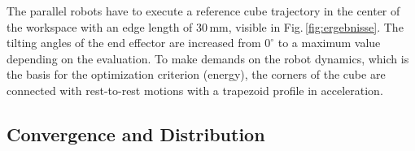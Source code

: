 \documentclass[fleqn,a4paper,10pt]{article}
\newcommand{\bm}[1]{\mathbf{#1}}
\newcommand{\transp}[0]{{\mathrm{T}}}
\begin{document}
\begin{multicols}{2}
The parallel robots have to execute a reference cube trajectory in the center of the workspace with an edge length of 30\,mm, visible in Fig.\,\ref{fig:ergebnisse}.
The tilting angles of the end effector are increased from $0^\circ$ to a maximum value depending on the evaluation. %
To make demands on the robot dynamics, which is the basis for the optimization criterion (energy), the corners of the cube are connected with rest-to-rest motions with a  trapezoid profile in acceleration.




\subsection{Convergence and Distribution}
\label{sec:res_convergence}


\end{multicols}
\end{document}
